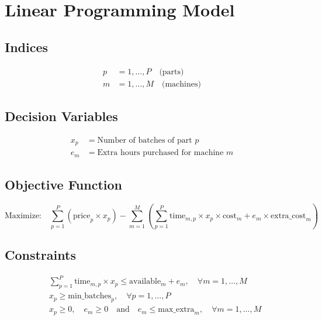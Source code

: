 \documentclass{article}
\begin{document}
\section*{Linear Programming Model}

\subsection*{Indices}
\begin{align*}
    p &= 1, \ldots, P \quad \text{(parts)} \\
    m &= 1, \ldots, M \quad \text{(machines)}
\end{align*}

\subsection*{Decision Variables}
\begin{align*}
    x_p &= \text{Number of batches of part } p \\
    e_m &= \text{Extra hours purchased for machine } m
\end{align*}

\subsection*{Objective Function}
\[
\text{Maximize:} \quad \sum_{p=1}^P (\text{price}_p \times x_p) - \sum_{m=1}^M \left( \sum_{p=1}^P \text{time}_{m,p} \times x_p \times \text{cost}_m + e_m \times \text{extra\_cost}_m \right)
\]

\subsection*{Constraints}
\begin{align*}
    &\sum_{p=1}^P \text{time}_{m,p} \times x_p \leq \text{available}_m + e_m, \quad \forall m = 1, \ldots, M \\
    &x_p \geq \text{min\_batches}_p, \quad \forall p = 1, \ldots, P \\
    &x_p \geq 0, \quad e_m \geq 0 \quad \text{and} \quad e_m \leq \text{max\_extra}_m, \quad \forall m = 1, \ldots, M
\end{align*}
\end{document}
